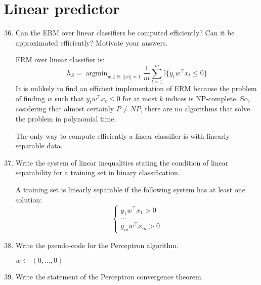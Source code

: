 \documentclass[a4paper]{article}
\newcommand{\RN}{\ensuremath{\mathbb{R}}}
\newcommand{\I}{\ensuremath{\mathbb{I}}}
\DeclareMathOperator*{\argmin}{argmin}
\begin{document}
\section{Linear predictor}
\begin{enumerate}
    \setcounter{enumi}{35}
    \item Can the ERM over linear classifiers be computed efficiently? Can it be approximated
    efficiently? Motivate your answers.

    ERM over linear classifier is:
    $$ h_S = \argmin_{w\in\RN:||w||=1} \frac{1}{m}\sum_{t=1}^m \I\{y_tw^\top x_t\leq0\} $$
    It is unlikely to find an efficient implementation of ERM because the problem of
    finding $w$ such that $y_tw^\top x_t\leq0$ for at most $k$ indices is NP-complete.
    So, cosidering that almost certainly $P\neq NP$, there are no algorithms that solve the
    problem in polynomial time.

    The only way to compute efficiently a linear classifier is with linearly separable data.
    \item Write the system of linear inequalities stating the condition of linear separability
    for a training set in binary classification.

    A training set is linearly separable if the following system has at least one solution:
    $$ \begin{cases}
        y_1w^\top x_1 > 0\\
        \dots\\
        y_mw^\top x_m > 0
    \end{cases} $$
    \item Write the pseudo-code for the Perceptron algorithm.
    
    \begin{minipage}{.94\textwidth}
        \begin{algorithm}[H]
            \DontPrintSemicolon
            $w \leftarrow (0,\dots,0)$\;
        \end{algorithm}
    \end{minipage}
    \item Write the statement of the Perceptron convergence theorem.


\end{enumerate}
\end{document}
